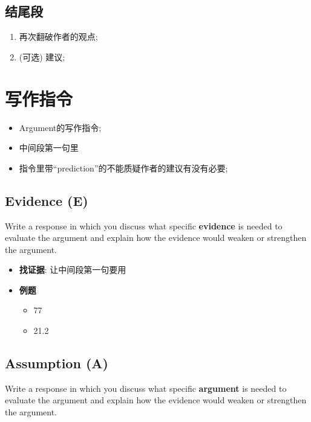   \subsection{结尾段}

    \begin{enumerate}
      \item 再次翻破作者的观点;
      \item (可选) 建议;
    \end{enumerate}

\section{写作指令}

  \begin{itemize}
    \item Argument的写作指令;
    \item 中间段第一句里
    \item 指令里带“prediction”的不能质疑作者的建议有没有必要;
  \end{itemize}

  \subsection{Evidence (E)}

    Write a response in which you discuss what specific \textbf{evidence} is
    needed to evaluate the argument and explain how the evidence would weaken or
    strengthen the argument.

    \begin{itemize}
      \item \textbf{找证据}: 让中间段第一句要用
      \item \textbf{例题}
      \begin{itemize}
        \item 77
        \item 21.2
      \end{itemize}
    \end{itemize}

  \subsection{Assumption (A)}

    Write a response in which you discuss what specific \textbf{argument} is
    needed to evaluate the argument and explain how the evidence would weaken or
    strengthen the argument.

